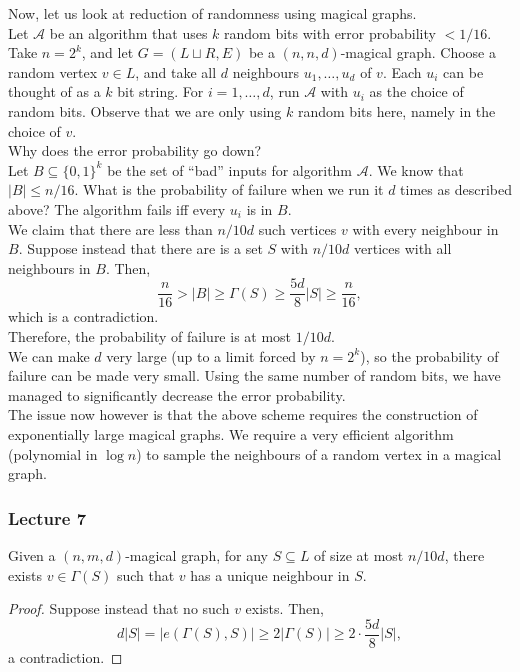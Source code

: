 			Now, let us look at reduction of randomness using magical graphs.\\
			Let $\mathcal{A}$ be an algorithm that uses $k$ random bits with error probability $<1/16$. Take $n=2^k$, and let $G=(L\sqcup R,E)$ be a $(n,n,d)$-magical graph. Choose a random vertex $v\in L$, and take all $d$ neighbours $u_1,\ldots,u_d$ of $v$. Each $u_i$ can be thought of as a $k$ bit string. For $i=1,\ldots,d$, run $\mathcal{A}$ with $u_i$ as the choice of random bits. Observe that we are only using $k$ random bits here, namely in the choice of $v$.\\
			
			Why does the error probability go down?\\
			Let $B \subseteq \{0,1\}^k$ be the set of ``bad'' inputs for algorithm $\mathcal{A}$. We know that $|B| \le n/16$. What is the probability of failure when we run it $d$ times as described above? The algorithm fails iff every $u_i$ is in $B$.\\
			We claim that there are less than $n/10d$ such vertices $v$ with every neighbour in $B$. Suppose instead that there are is a set $S$ with $n/10d$ vertices with all neighbours in $B$. Then,
			\[ \frac{n}{16} > |B| \ge \Gamma(S) \ge \frac{5d}{8}|S| \ge \frac{n}{16}, \]
			which is a contradiction.\\
			Therefore, the probability of failure is at most $1/10d$.\\
			We can make $d$ very large (up to a limit forced by $n = 2^k$), so the probability of failure can be made very small. Using the same number of random bits, we have managed to significantly decrease the error probability.\\
			The issue now however is that the above scheme requires the construction of exponentially large magical graphs. We require a very efficient algorithm (polynomial in $\log n$) to sample the neighbours of a random vertex in a magical graph.


		\subsubsection{Lecture 7}


			\begin{lemma}
				\label{exists vert with unique neighbour}
				Given a $(n,m,d)$-magical graph, for any $S \subseteq L$ of size at most $n/10d$, there exists $v \in \Gamma(S)$ such that $v$ has a unique neighbour in $S$.
			\end{lemma}
			\begin{proof}
				Suppose instead that no such $v$ exists. Then,
				\[ d|S| = |e(\Gamma(S),S)| \ge 2|\Gamma(S)| \ge 2 \cdot \frac{5d}{8}|S|, \]
				a contradiction.
			\end{proof}

